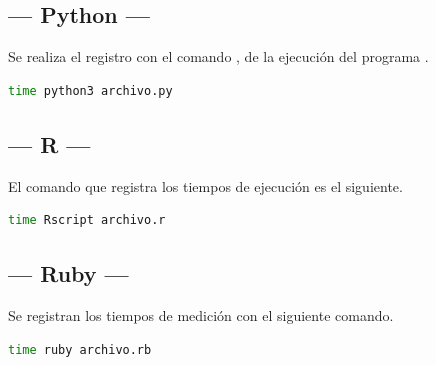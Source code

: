 \documentclass[11pt,a4paper]{article}
\begin{document}
\begin{minipage}{0.5\linewidth}

	\subsection{--- Python ---} %
	\label{sub:lenguaje_python}
	Se realiza el registro con el comando , de la ejecución del programa .
	\begin{lstlisting}[language = bash]
time python3 archivo.py
	\end{lstlisting}

	\subsection{--- R ---} %
	\label{sub:lenguaje_r}
	El comando que registra los tiempos de ejecución es el siguiente.
	\begin{lstlisting}[language = bash]
time Rscript archivo.r
	\end{lstlisting}

	\subsection{--- Ruby ---} %
	\label{sub:lenguaje_ruby}
	Se registran los tiempos de medición con el siguiente comando.
	\begin{lstlisting}[language = bash]
time ruby archivo.rb
	\end{lstlisting}

\end{minipage}


\newpage
\end{document}
